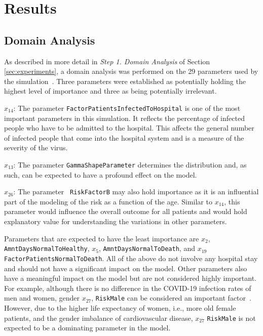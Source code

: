 \documentclass[conference]{IEEEtran}
\begin{document}
\section{Results}\label{sec:results}

\subsection{Domain Analysis}
As described in more detail in \emph{Step 1. Domain Analysis} of Section \ref{sec:experiments}, a domain analysis was performed on the 29 parameters used by the simulation~\citep{Anon21c}.
Three parameters were established as potentially holding the highest level of importance and three as being potentially irrelevant.

\begin{compactitem} 
\item[$x_{14}$:] The parameter \texttt{FactorPatientsInfectedToHospital} is one of the most important parameters in this simulation. It reflects the percentage of infected people who have to be admitted to the hospital. This affects the general number of infected people that come into the hospital system and is a measure of the severity of the virus.
\item[$x_{13}$:] The parameter \texttt{GammaShapeParameter} determines the distribution and, as such, can be expected to have a profound effect on the model.
\item[$x_{26}$:] The parameter \texttt{ RiskFactorB} may also hold importance as it is an influential part of the modeling of the risk as a function of the age. Similar to $x_{14}$, this parameter would influence the overall outcome for all patients and would hold explanatory value for understanding the variations in other parameters.
\end{compactitem}
Parameters that are expected to have the least importance are $x_{2}$, \texttt{AmntDaysNormalToHealthy}, $x_{5}$, \texttt{AmntDaysNormalToDeath}, and $x_{19}$ \texttt{FactorPatientsNormalToDeath}. All of the above do not involve any hospital stay and should not have a significant impact on the model. 
Other parameters also have a meaningful impact on the model but are not considered highly important. 
For example, although there is no difference in the COVID-19 infection rates of men and women, gender $x_{27}$, \texttt{RiskMale} can be considered an important factor~\citep{Peckham20}. However, due to the higher life expectancy of women, i.e., more old female patients, and the gender imbalance of cardiovascular disease, $x_{27}$ \texttt{RiskMale} is not expected to be a dominating parameter in the model.
\end{document}

